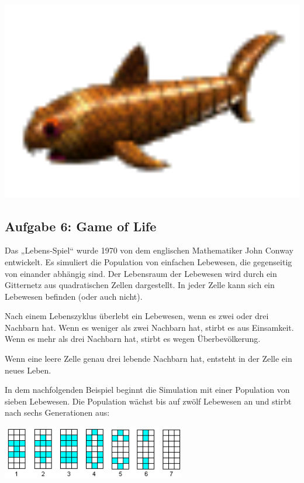 \begin{minipage}{0.1\textwidth}
\includegraphics[width=1.0\textwidth]{./inf/SEKII/18_Java_Arrays/Aufgabe5d.png}
\end{minipage}
\hfill

\vfill

\subsection{Aufgabe 6: Game of Life}

Das „Lebens-Spiel“ wurde 1970 von dem englischen Mathematiker John Conway
entwickelt. Es simuliert die Population von einfachen Lebewesen, die
gegenseitig von einander abhängig sind. Der Lebensraum der Lebewesen wird durch
ein Gitternetz aus quadratischen Zellen dargestellt. In jeder Zelle kann sich
ein Lebewesen befinden (oder auch nicht).

Nach einem Lebenszyklus überlebt ein Lebewesen, wenn es zwei oder drei Nachbarn
hat. Wenn es weniger als zwei Nachbarn hat, stirbt es aus Einsamkeit. Wenn es
mehr als drei Nachbarn hat, stirbt es wegen Überbevölkerung.

Wenn eine leere Zelle genau drei lebende Nachbarn hat, entsteht in der Zelle
ein neues Leben.

In dem nachfolgenden Beispiel beginnt die Simulation mit einer Population von
sieben Lebewesen. Die Population wächst bis auf zwölf Lebewesen an und stirbt
nach sechs Generationen aus:

\begin{center}
\includegraphics[width=0.6\textwidth]{./inf/SEKII/18_Java_Arrays/GoL1.png}
\end{center}

